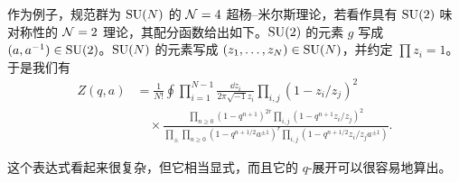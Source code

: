 

作为例子，规范群为 $\mathrm{SU}(N)$ 的 $\mathcal{N}=4$ 超杨–米尔斯理论，若看作具有 $\mathrm{SU}(2)$ 味对称性的 $\mathcal{N}=2$ 理论，其配分函数给出如下。$\mathrm{SU}(2)$ 的元素 $g$ 写成 $(a,a^{-1})\in\mathrm{SU}(2)$。$\mathrm{SU}(N)$ 的元素写成 $(z_1,\ldots,z_N)\in\mathrm{SU}(N)$，并约定 $\prod z_i=1$。于是我们有
\begin{equation}
\begin{aligned}
Z(q,a)&=\frac{1}{N!}\oint\prod_{i=1}^{N-1}\frac{\dd z_i}{2\pi\sqrt{-1}z_i}\prod_{i,j}(1-z_i/z_j)^2\\
&\quad\times\frac{\prod_{n\ge0}(1-q^{n+1})^{2r}\prod_{i,j}(1-q^{n+1}z_i/z_j)^2}{\prod_\pm\prod_{n\ge0}(1-q^{n+1/2}a^{\pm1})^r\prod_{i,j}(1-q^{n+1/2}z_i/z_j a^{\pm1})}.
\end{aligned}
\tag{4.12}
\end{equation}



这个表达式看起来很复杂，但它相当显式，而且它的 $q$-展开可以很容易地算出。

